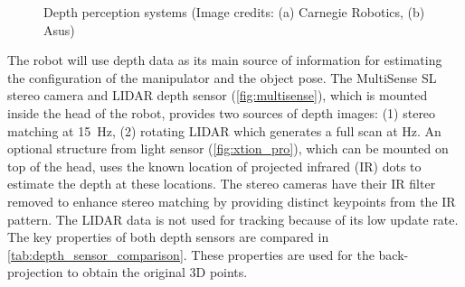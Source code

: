 \begin{figure}
\begin{minipage}{0.5\textwidth}
\caption[Depth sensors]{Depth perception systems (Image credits: (a) Carnegie Robotics, (b) Asus)}
\label{fig:depth_sensors}
\end{minipage}
\end{figure}

The robot will use depth data as its main source of information for estimating the configuration of the manipulator and the object pose. The MultiSense SL stereo camera and LIDAR depth sensor (\cref{fig:multisense}), which is mounted inside the head of the robot, provides two sources of depth images: (1) stereo matching at \SI{15}{\hertz}, (2) rotating LIDAR which generates a full scan at  \si{\hertz}. An optional structure from light sensor (\cref{fig:xtion_pro}), which can be mounted on top of the head, uses the known location of projected infrared (IR) dots to estimate the depth at these locations. The stereo cameras have their IR filter removed to enhance stereo matching by providing distinct keypoints from the IR pattern. The LIDAR data is not used for tracking because of its low update rate.
The key properties of both depth sensors are compared in \cref{tab:depth_sensor_comparison}. These properties are used for the back-projection to obtain the original 3D points.

